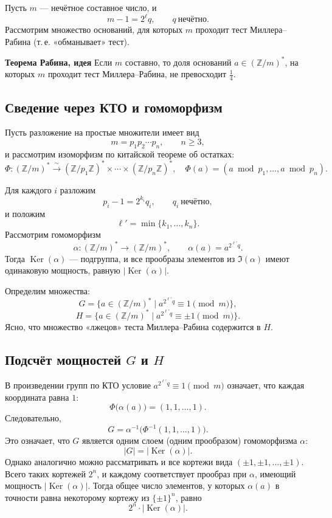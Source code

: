 \documentclass[12pt,a4paper]{article}
\newcommand{\Z}{\mathbb{Z}}
\DeclareMathOperator{\Ker}{Ker}
\begin{document}
Пусть $m$ — нечётное составное число, и
\[
m-1=2^{\ell}q,\qquad q\ \text{нечётно}.
\]
Рассмотрим множество оснований, для которых $m$ проходит тест Миллера--Рабина (т.\,е. «обманывает» тест).

\textbf{Теорема Рабина, идея}
Если $m$ составно, то доля оснований $a\in(\Z/m)^{\ast}$, на которых $m$ проходит тест Миллера--Рабина, не превосходит $\frac14$.

\subsection*{Сведение через КТО и гомоморфизм}

Пусть разложение на простые множители имеет вид
\[
m=p_1p_2\cdots p_n,\qquad n\ge 3,
\]
и рассмотрим изоморфизм по китайской теореме об остатках:
\[
\Phi:(\Z/m)^{\ast}\xrightarrow{\ \sim\ }(\Z/p_1\Z)^{\ast}\times\cdots\times(\Z/p_n\Z)^{\ast},
\quad
\Phi(a)=(a\bmod p_1,\dots,a\bmod p_n).
\]

Для каждого $i$ разложим
\[
p_i-1=2^{k_i}q_i,\qquad q_i\ \text{нечётно},
\]
и положим
\[
\ell'=\min\{k_1,\dots,k_n\}.
\]
Рассмотрим гомоморфизм
\[
\alpha:(\Z/m)^{\ast}\to(\Z/m)^{\ast},\qquad \alpha(a)=a^{2^{\ell'}q}.
\]
Тогда $\Ker(\alpha)$ — подгруппа, и все прообразы элементов из $\Im(\alpha)$ имеют одинаковую мощность, равную $|\Ker(\alpha)|$.

Определим множества:
\[
G=\{a\in(\Z/m)^{\ast}\mid a^{2^{\ell'}q}\equiv 1\pmod m\},
\]
\[
H=\{a\in(\Z/m)^{\ast}\mid a^{2^{\ell'}q}\equiv \pm 1\pmod m\}.
\]
Ясно, что множество «лжецов» теста Миллера--Рабина содержится в $H$.

\subsection*{Подсчёт мощностей $G$ и $H$}

В произведении групп по КТО условие $a^{2^{\ell'}q}\equiv 1\pmod m$ означает, что каждая координата равна $1$:
\[
\Phi\bigl(\alpha(a)\bigr)=(1,1,\dots,1).
\]
Следовательно,
\[
G=\alpha^{-1}\bigl(\Phi^{-1}(1,1,\dots,1)\bigr).
\]
Это означает, что $G$ является одним слоем (одним прообразом) гомоморфизма $\alpha$:
\[
|G|=|\Ker(\alpha)|.
\]
Однако аналогично можно рассматривать и все кортежи вида $(\pm 1,\pm 1,\dots,\pm 1)$.
Всего таких кортежей $2^{n}$, и каждому соответствует прообраз при $\alpha$, имеющий мощность $|\Ker(\alpha)|$.
Тогда общее число элементов, у которых $\alpha(a)$ в точности равна некоторому кортежу из $\{\pm 1\}^n$, равно
\[
2^{n}\cdot |\Ker(\alpha)|.
\]
\end{document}
